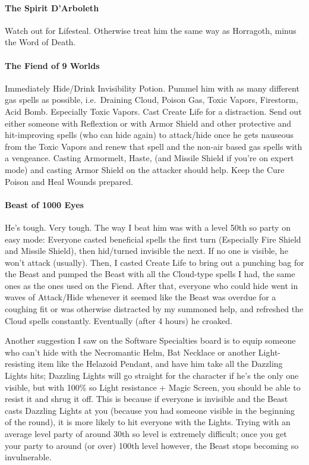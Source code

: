\documentclass[12pt]{article}
\let\oldparagraph\paragraph
\renewcommand{\paragraph}[1]{\oldparagraph{#1}\mbox{}}
\begin{document}
\paragraph{The Spirit D'Arboleth} Watch out for Lifesteal. Otherwise treat
him the same way as Horragoth, minus the Word of Death.

\paragraph{The Fiend of 9 Worlds} Immediately Hide/Drink Invisibility Potion.
Pummel him with as many different gas spells as possible, i.e.~Draining
Cloud, Poison Gas, Toxic Vapors, Firestorm, Acid Bomb. Especially Toxic
Vapors. Cast Create Life for a distraction. Send out either someone with
Reflextion or with Armor Shield and other protective and hit-improving spells
(who can hide again) to attack/hide once he gets nauseous from the Toxic
Vapors and renew that spell and the non-air based gas spells with a
vengeance. Casting Armormelt, Haste, (and Missile Shield if you're on expert
mode) and casting Armor Shield on the attacker should help. Keep the Cure
Poison and Heal Wounds prepared.

\paragraph{Beast of 1000 Eyes} He's tough. Very tough. The way I beat him was
with a level 50th so party on easy mode: Everyone casted beneficial spells
the first turn (Especially Fire Shield and Missile Shield), then hid/turned
invisible the next. If no one is visible, he won't attack (usually). Then, I
casted Create Life to bring out a punching bag for the Beast and pumped the
Beast with all the Cloud-type spells I had, the same ones as the ones used on
the Fiend. After that, everyone who could hide went in waves of Attack/Hide
whenever it seemed like the Beast was overdue for a coughing fit or was
otherwise distracted by my summoned help, and refreshed the Cloud spells
constantly. Eventually (after 4 hours) he croaked.

Another suggestion I saw on the Software Specialties board is to equip
someone who can't hide with the Necromantic Helm, Bat Necklace or another
Light-resisting item like the Helazoid Pendant, and have him take all the
Dazzling Lights hits; Dazzling Lights will go straight for the character if
he's the only one visible, but with 100\% so Light resistance + Magic Screen,
you should be able to resist it and shrug it off.  This is because if
everyone is invisible and the Beast casts Dazzling Lights at you (because you
had someone visible in the beginning of the round), it is more likely to hit
everyone with the Lights.  Trying with an average level party of around 30th
so level is extremely difficult; once you get your party to around (or over)
100th level however, the Beast stops becoming so invulnerable.
\end{document}
